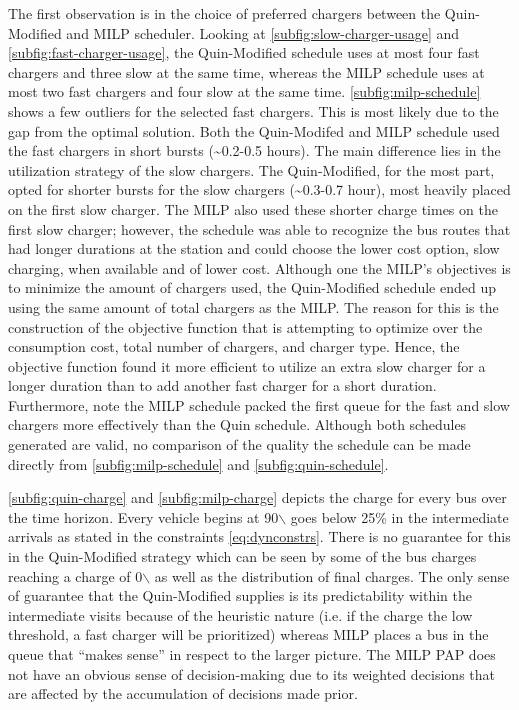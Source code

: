 \documentclass[utf8]{FrontiersinHarvard}
\newcommand{\bcharge}{0.7 }                                                     %
\newcommand{\mincharge}{25\% }                                                  %
\begin{document}
The first observation is in the choice of preferred chargers between the Quin-Modified and MILP scheduler. Looking at
\autoref{subfig:slow-charger-usage} and \autoref{subfig:fast-charger-usage}, the Quin-Modified schedule uses at most
four fast chargers and three slow at the same time, whereas the MILP schedule uses at most two fast chargers and four
slow at the same time. \autoref{subfig:milp-schedule} shows a few outliers for the selected fast chargers. This is most
likely due to the gap from the optimal solution. Both the Quin-Modifed and MILP schedule used the fast chargers in short
bursts (\textasciitilde{}0.2-0.5 hours). The main difference lies in the utilization strategy of the slow chargers. The Quin-Modified,
for the most part, opted for shorter bursts for the slow chargers (\textasciitilde{}0.3-0.7 hour), most heavily placed on the first slow
charger. The MILP also used these shorter charge times on the first slow charger; however, the schedule was able to
recognize the bus routes that had longer durations at the station and could choose the lower cost option, slow charging,
when available and of lower cost. Although one the MILP's objectives is to minimize the amount of chargers used, the
Quin-Modified schedule ended up using the same amount of total chargers as the MILP. The reason for this is the
construction of the objective function that is attempting to optimize over the consumption cost, total number of
chargers, and charger type. Hence, the objective function found it more efficient to utilize an extra slow charger for a
longer duration than to add another fast charger for a short duration. Furthermore, note the MILP schedule packed the
first queue for the fast and slow chargers more effectively than the Quin schedule. Although both schedules generated
are valid, no comparison of the quality the schedule can be made directly from \autoref{subfig:milp-schedule} and
\autoref{subfig:quin-schedule}.


\autoref{subfig:quin-charge} and \autoref{subfig:milp-charge} depicts the charge for every bus over the time horizon.
Every vehicle begins at 90$\backslash$%
goes below \mincharge in the intermediate arrivals as stated in the constraints \autoref{eq:dynconstrs}. There is no
guarantee for this in the Quin-Modified strategy which can be seen by some of the bus charges reaching a charge of 0$\backslash$%
as well as the distribution of final charges. The only sense of guarantee that the Quin-Modified supplies is its
predictability within the intermediate visits because of the heuristic nature (i.e. if the charge the low threshold, a
fast charger will be prioritized) whereas MILP places a bus in the queue that ``makes sense'' in respect to the larger
picture. The MILP PAP does not have an obvious sense of decision-making due to its weighted decisions that are affected
by the accumulation of decisions made prior.
\end{document}
